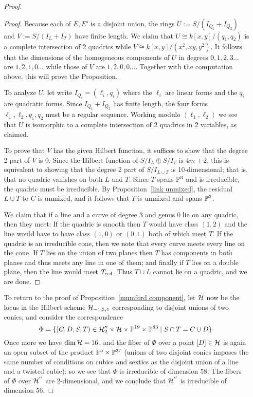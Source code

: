\begin{proof}
\begin{proof}
Because each of $E,E'$ is a disjoint union, the rings $U := S/(I_{Q_1}+I_{Q_2})$ and $V := S/(I_L+I_T)$
have finite length. We claim that $U \cong k[x,y]/(q_1,q_2)$ is a complete intersection of 2 quadrics while
$V \cong k[x,y]/(x^2,xy,y^2)$. It follows that the dimensions of the homogeneous components of 
$U$ in degrees $0,1,2,3\dots$ are $1,2,1,0\dots$ while those of $V$ are $1,2,0,0\dots$. Together
with the computation above, this will prove the Proposition.

To analyze $U$, let write $I_{Q_i} = (\ell_i, q_i)$ where the $\ell_i$ are linear forms and the $q_i$ are 
quadratic forms. Since $I_{Q_1} +I_{Q_2}$ has finite length, the four forms
$\ell_1,\ell_2,q_1,q_2$ must be a regular sequence. Working modulo $(\ell_1,\ell_2)$ we see that 
$U$ is isomorphic to a complete intersection of 2 quadrics in 2 variables, as claimed.

To prove that $V$ has the given Hilbert function, it suffices to show that the degree 2 part of $V$ is 0. Since the Hilbert function of $S/I_L \oplus S/I_T$ is $4m+2$, this is equivalent to showing that the degree 2 part of
$S/I_{L\cup T}$ is 10-dimensional; that is, that no quadric vanishes on
both $L$ and $T$. Since $T$ spans $\PP^3$ and is irreducible, the quadric must be irreducible. By Proposition~\ref{link unmixed},
the residual $L\cup T$ to $C$ is unmixed, and it follows that $T$ is unmixed and spans $\PP^{3}$. 

We claim that if a line and a curve of degree 3 and genus 0 lie on any quadric, then they meet: If the quadric is smooth then $T$ would have class $(1,2)$ and the line would have to have class $(1,0)$ or
$(0,1)$ both of which meet $T$. If the quadric is an irreducible cone, then we note that  every curve meets every line on the cone. If $T$ lies on the union of two planes then $T$ has components in both planes and thus meets any line in one of them; and finally if $T$ lies on a double plane, then the line would meet $T_{\rm red}$. Thus
$T\cup L$ cannot lie on a quadric, and we are done.
\end{proof}


To return to the proof of Proposition~\ref{mumford component}, let $\cH$ now be the locus in the Hilbert scheme $\cH_{-1,3,4}$ corresponding to disjoint unions of two conics, and consider the correspondence
$$
\Phi = \{(C,D,S,T) \in \cH_{2}'' \times \cH \times \PP^{19} \times \PP^{83} \mid S \cap T = C \cup D \}.
$$
Once more we have $\dim \cH = 16$, and the fiber of $\Phi$ over a point $[D] \in \cH$ is again an open subset of the product $\PP^5 \times \PP^{37}$ (unions of two disjoint conics imposes the same number of conditions on cubics and sextics as the disjoint union of a line and a twisted cubic); so we see that $\Phi$ is irreducible of dimension 58. The fibers of $\Phi$ over $ \cH^{''}$ are 2-dimensional, and we conclude that $ \cH^{''}$ is irreducible of dimension 56.


\end{proof}

